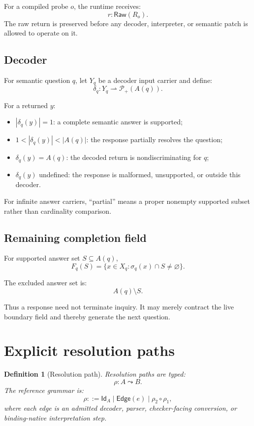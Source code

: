 \documentclass[11pt,oneside]{article}
\newtheorem{definition}{Definition}[section]
\newcommand{\Raw}{\mathsf{Raw}}
\begin{document}
For a compiled probe \(o\), the runtime receives:
\[
r:\Raw(R_o).
\]
The raw return is preserved before any decoder, interpreter, or semantic patch is allowed to operate on it.

\subsection{Decoder}

For semantic question \(q\), let \(Y_q\) be a decoder input carrier and define:
\[
\boxed{
\delta_q:
Y_q
\rightharpoonup
\mathcal P_+(A(q)).
}
\]

For a returned \(y\):
\begin{itemize}
\item \(|\delta_q(y)|=1\): a complete semantic answer is supported;
\item \(1<|\delta_q(y)|<|A(q)|\): the response partially resolves the question;
\item \(\delta_q(y)=A(q)\): the decoded return is nondiscriminating for \(q\);
\item \(\delta_q(y)\) undefined: the response is malformed, unsupported, or outside this decoder.
\end{itemize}

For infinite answer carriers, ``partial'' means a proper nonempty supported subset rather than cardinality comparison.

\subsection{Remaining completion field}

For supported answer set \(S\subseteq A(q)\),
\[
\boxed{
F_q(S)
=
\{x\in X_q:\sigma_q(x)\cap S\neq\varnothing\}.
}
\]

The excluded answer set is:
\[
A(q)\setminus S.
\]

Thus a response need not terminate inquiry.  It may merely contract the live boundary field and thereby generate the next question.

\section{Explicit resolution paths}

\begin{definition}[Resolution path]
Resolution paths are typed:
\[
\boxed{
\rho:A\leadsto B.
}
\]
The reference grammar is:
\[
\rho::=
\mathsf{Id}_A
\mid
\mathsf{Edge}(e)
\mid
\rho_2\circ\rho_1,
\]
where each edge is an admitted decoder, parser, checker-facing conversion, or binding-native interpretation step.
\end{definition}
\end{document}
